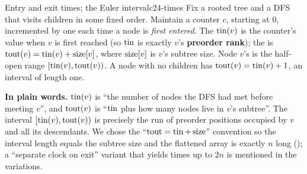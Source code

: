 \begin{definition}{Entry and exit times; the Euler interval}{c24-times}
Fix a rooted tree and a DFS that visits children in some fixed order. Maintain a counter
$c$, starting at $0$, incremented by one each time a node is \emph{first entered}. The
 $\operatorname{tin}(v)$ is the counter's value when $v$ is first reached (so
$\operatorname{tin}$ is exactly $v$'s \textbf{preorder rank}); the  is
$\operatorname{tout}(v) = \operatorname{tin}(v) + \operatorname{size}[v]$, where $\operatorname{size}[v]$ is $v$'s subtree size. Node $v$'s
 is the half-open range $[\operatorname{tin}(v), \operatorname{tout}(v))$. A node with no children
has $\operatorname{tout}(v) = \operatorname{tin}(v) + 1$, an interval of length one.
\end{definition}

\noindent\textbf{In plain words.} $\operatorname{tin}(v)$ is ``the number of nodes the DFS had met before
meeting $v$'', and $\operatorname{tout}(v)$ is ``$\operatorname{tin}$ plus how many nodes live in $v$'s subtree''. The
interval $[\operatorname{tin}(v), \operatorname{tout}(v))$ is precisely the run of preorder positions occupied by $v$ and
all its descendants. We chose the ``$\operatorname{tout} = \operatorname{tin} + \operatorname{size}$'' convention so the interval
length equals the subtree size and the flattened array is exactly $n$ long
(); a ``separate clock on exit'' variant that yields times up to $2n$
is mentioned in the variations.

